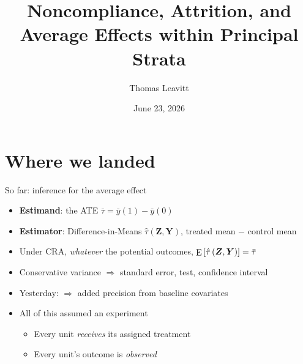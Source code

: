 \documentclass[table, xcolor = {dvipsnames}, 9pt]{beamer}
\title[Effects within principal strata]{Noncompliance, Attrition, and Average Effects within Principal Strata} %
\author{Thomas Leavitt} %
\institute[] %
{
\medskip
\textit{}
}
\date{June 23, 2026} %
\theoremstyle{plain}
\newcommand{\mh}[1]{{\color{magenta}{#1}}}
\DeclareMathOperator{\E}{\rm{E}}
\begin{document}
\begin{frame}
\titlepage %
\end{frame}

\section{Where we landed}

\begin{frame}[t]{So far: inference for the average effect}
\vfill
\begin{itemize} \vfill
\item \textbf{Estimand}: the ATE $\bar{\tau} = \bar{y}(1) - \bar{y}(0)$ \vfill
\item \textbf{Estimator}: Difference-in-Means $\hat{\tau}\left(\bm{Z}, \bm{Y}\right)$, treated mean $-$ control mean \vfill
\item Under CRA, \emph{whatever} the potential outcomes, $\E\left[\hat{\tau}\left(\bm{Z}, \bm{Y}\right)\right] = \bar{\tau}$ \vfill
\item Conservative variance $\Rightarrow$ standard error, test, confidence interval \vfill
\item Yesterday: \mh{covariance adjustment} $\Rightarrow$ added precision from baseline covariates \vfill
\item All of this assumed an \mh{ideal} experiment \vfill
\begin{itemize} \vfill
\item Every unit \emph{receives} its assigned treatment \vfill
\item Every unit's outcome is \emph{observed} \vfill
\end{itemize} \vfill
\end{itemize} \vfill
\end{frame}
\end{document}
